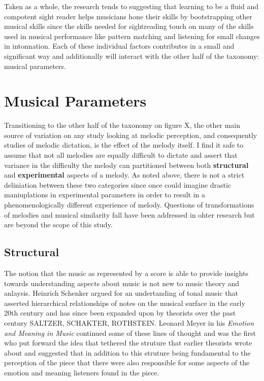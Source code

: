 \documentclass[]{book}
\begin{document}
Taken as a whole, the research tends to suggesting that learning to be a fluid and compotent sight reader helps musicians hone their skills by bootstrapping other musical skills since the skills needed for sightreading touch on many of the skills used in musical performance like pattern matching and listening for small changes in intonnation.
Each of these individual factors contributes in a small and significant way and additionally will interact with the other half of the taxonomy: musical parameters.

\hypertarget{musical-parameters}{%
\section{Musical Parameters}\label{musical-parameters}}

Transitioning to the other half of the taxonomy on figure X, the other main source of variation on any study looking at melodic perception, and consequently studies of melodic dictation, is the effect of the melody itself.
I find it safe to assume that not all melodies are equally difficult to dictate and assert that variance in the difficulty the melody can partitioned between both \textbf{structural} and \textbf{experimental} aspects of a melody.
As noted above, there is not a strict deliniation between these two categories since once could imagine drastic maniuplations in experimental parameters in order to result in a phenomenologically different experience of melody.
Questions of transformations of melodies and musical similarity fall have been addressed in ohter research \citep{cambouropoulosHowSimilarSimilar2009, wigginsModelsMusicalSimilarity2007} but are beyond the scope of this study.

\hypertarget{structural}{%
\subsection{Structural}\label{structural}}

The notion that the music as represented by a score is able to provide insights towards understanding aspects about music is not new to music theory and anlaysis.
Heinrich Schenker argued for an undertanding of tonal music \citep{schenkerFreieSatz1935} that asserted hierarchical relationships of notes on the musical surface in the early 20th century and has since been expanded upon by theorists over the past century SALTZER, SCHAKTER, ROTHSTEIN.
Leonard Meyer in his \emph{Emotion and Meaning in Music} \citep{meyerEmotionMeaningMusic1956} continued some of these lines of thought and was the first who put forward the idea that tethered the struture that earlier theorists wrote about and suggested that in addition to this struture being fundamental to the perception of the piece that there were also responsible for some aspects of the emotion and meaning listeners found in the piece.
\end{document}
